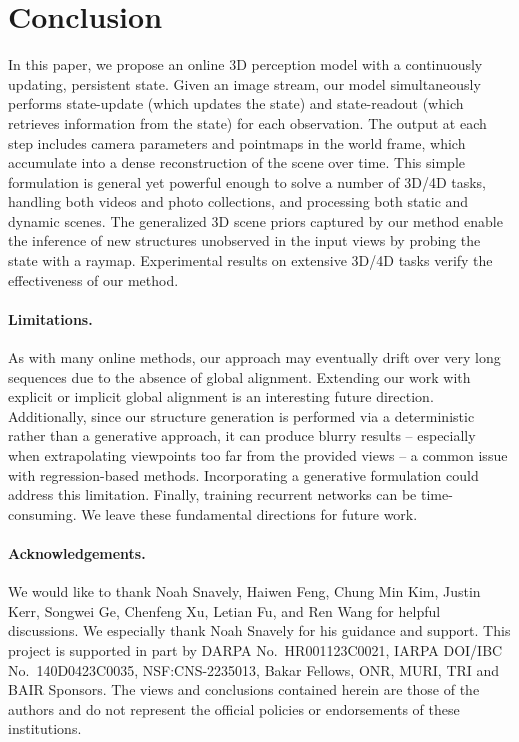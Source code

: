 \section{Conclusion}
In this paper, we propose an online 3D perception model with a continuously updating, persistent state. Given an image stream, our model simultaneously performs state-update (which updates the state) and state-readout (which retrieves information from the state) for each observation. The output at each step includes camera parameters and pointmaps in the world frame, which accumulate into a dense reconstruction of the scene over time. This simple formulation is general yet powerful enough to solve a number of 3D/4D tasks, handling both videos and photo collections, and processing both static and dynamic scenes. 
The generalized 3D scene priors captured by our method enable the inference of new structures unobserved in the input views by probing the state with a raymap. Experimental results on extensive 3D/4D tasks verify the effectiveness of our method.

\vspace{-1em}
\paragraph{Limitations.} 
As with many online methods, our approach may eventually drift over very long sequences due to the absence of global alignment. Extending our work with explicit or implicit global alignment is an interesting future direction. Additionally, since our structure generation is performed via a deterministic rather than a generative approach, it can produce blurry results – especially when extrapolating viewpoints too far from the provided views  – a common issue with regression-based methods.  Incorporating a generative formulation could address this limitation. Finally, training recurrent networks can be time-consuming. We leave these fundamental directions for future work.

\paragraph{Acknowledgements.} We would like to thank Noah Snavely, Haiwen Feng, Chung Min Kim,  Justin Kerr, Songwei Ge, Chenfeng Xu, Letian Fu, and Ren Wang for helpful discussions. We especially thank Noah Snavely for his guidance and support.
This project is supported in part by DARPA No.~HR001123C0021, IARPA DOI/IBC No.~140D0423C0035, NSF:CNS-2235013, Bakar Fellows, ONR, MURI, TRI and BAIR Sponsors. The views and conclusions contained herein are those of the authors and do not represent the official policies or endorsements of these institutions.